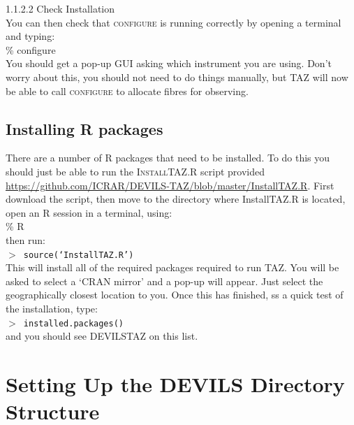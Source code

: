 \documentclass[12pt]{article}
\begin{document}
\textsf{1.1.2.2 Check Installation} \\

You can then check that \textsc{configure} is running correctly by opening a terminal and typing: \\

\hspace{10mm} \% configure\\

You should get a pop-up GUI asking which instrument you are using. Don't worry about this, you should not need to do things manually, but \textsc{TAZ} will now be able to call \textsc{configure} to allocate fibres for observing.

\subsection{Installing R packages}


There are a number of R packages that need to be installed. To do this you should just be able to run the \textsc{InstallTAZ.R} script provided \url{https://github.com/ICRAR/DEVILS-TAZ/blob/master/InstallTAZ.R}. First download the script, then move to the directory where InstallTAZ.R is located, open an R session in a terminal, using:\\

\hspace{10mm} \% R\\

then run:\\

\hspace{10mm}  \texttt{$>$ source(`InstallTAZ.R')}\\

This will install all of the required packages required to run \textsc{TAZ}. You will be asked to select a `CRAN mirror' and a pop-up will appear. Just select the geographically closest location to you. Once this has finished,  ss a quick test of the installation, type:\\

\hspace{10mm}  \texttt{$>$ installed.packages()}\\

and you should see DEVILSTAZ on this list.

\section{Setting Up the DEVILS Directory Structure}
\end{document}
